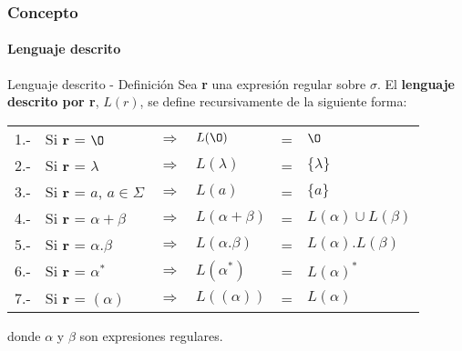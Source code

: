 \documentclass{beamer}
\begin{document}
        \begin{frame}
			\frametitle{Concepto}
			\framesubtitle{Lenguaje descrito}

			\begin{block}{Lenguaje descrito - Definici\'on}
			    Sea \textbf{r} una expresi\'on regular sobre $\sigma$. El \textbf{lenguaje descrito por r}, $L(r)$, se define recursivamente de la siguiente forma:
			    \begin{table}[H]
			            \begin{center}
			                \begin{tabular}{rlllll}
			                    1.- & Si \textbf{r} = $\O$                         & $\Rightarrow$ & $L(\O)$                     & = & $\O$\\
			                    2.- & Si \textbf{r} = $\lambda$                 & $\Rightarrow$ & $L(\lambda)$             & = & $\{\lambda\}$\\
			                    3.- & Si \textbf{r} = $a$, $a \in \Sigma$   & $\Rightarrow$ & $L(a)$                        & = & $\{a\}$ \\
			                    4.- & Si \textbf{r} = $\alpha + \beta$        & $\Rightarrow$ & $L(\alpha + \beta)$    & = & $L(\alpha) \cup L(\beta)$ \\
			                    5.- & Si \textbf{r} = $\alpha.\beta$           & $\Rightarrow$ & $L(\alpha.\beta)$       & = & $L(\alpha).L(\beta)$ \\
			                    6.- & Si \textbf{r} = $\alpha^{*}$              & $\Rightarrow$ & $L(\alpha^{*})$          & = & $L(\alpha)^{*}$\\
			                    7.- & Si \textbf{r} = $(\alpha)$                 & $\Rightarrow$ & $L((\alpha))$              & = & $L(\alpha)$ \\
			                \end{tabular}
			            \end{center}
			        \end{table}
			        donde $\alpha$ y $\beta$ son expresiones regulares.
			\end{block}
		\end{frame}
\end{document}
